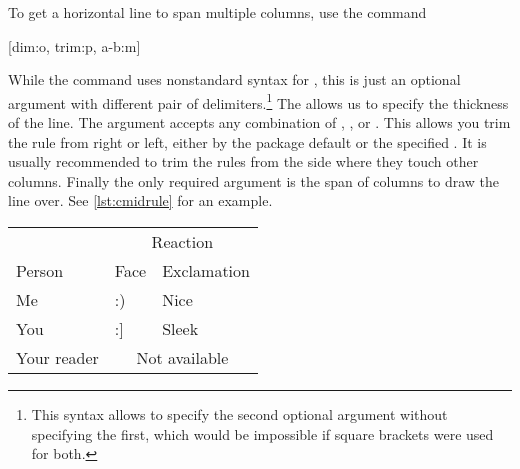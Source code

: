 To get a horizontal line to span multiple columns, use the command
\begin{lscommand}
  [dim:o, trim:p, a-b:m]
\end{lscommand}
While the command uses nonstandard syntax for , this is just an
optional argument with different pair of delimiters.\footnote{This syntax
  allows to specify the second optional argument without specifying the first,
  which would be impossible if square brackets were used for both.} The
 allows us to specify the thickness of the line. The 
argument accepts any combination of , ,
 or . This allows you trim the rule from right
or left, either by the package default or the specified . It is
usually recommended to trim the rules from the side where they touch other
columns. Finally the only required argument  is the span of columns
to draw the line over. See \autoref{lst:cmidrule} for an example.
\begin{listing}
  \begin{chktexignore}
  \begin{example}[examplewidth=0.85\linewidth, vertical_mode]
\begin{tabular}{@{}lll@{}}
  \toprule
              & \multicolumn{2}{c}{Reaction}      \\
  \cmidrule(l){2-3}
  Person      & Face & Exclamation                \\
  \midrule
  Me          & :)   & Nice                       \\
  You         & :]   & Sleek                      \\
  Your reader & \multicolumn{2}{c}{Not available} \\
  \bottomrule
\end{tabular}
\end{example}
\end{chktexignore}
  \caption{An example of using the  command inside a table.}\label{lst:cmidrule}
\end{listing}

